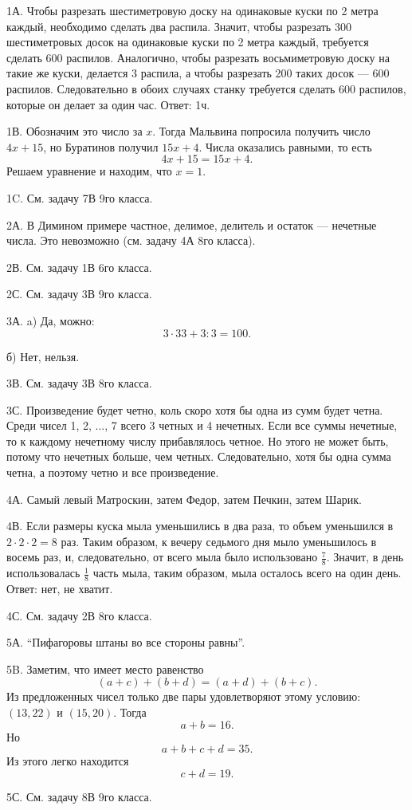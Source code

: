 \documentclass[12pt]{amsart}
\theoremstyle{definition}
\theoremstyle{remark}
\theoremstyle{plain}
\begin{document}
1А. Чтобы разрезать шестиметровую доску на одинаковые куски по 2 метра каждый, необходимо сделать два распила. Значит, чтобы разрезать 300 шестиметровых досок на одинаковые куски по 2 метра каждый, требуется сделать 600 распилов. Аналогично, чтобы разрезать восьмиметровую доску на такие же куски, делается 3 распила, а чтобы разрезать 200 таких досок --- 600 распилов. Следовательно в обоих случаях станку требуется сделать 600 распилов, которые он делает за один час. Ответ: 1ч.

1В. Обозначим это число за $x$. Тогда Мальвина попросила получить число $4x+15$, но Буратинов получил $15x+4$. Числа оказались равными, то есть
$$
4x+15=15x+4.
$$
Решаем уравнение и находим, что $x=1$.

1C. См. задачу 7В 9го класса.

2А. В Димином примере частное, делимое, делитель и остаток --- нечетные числа. Это невозможно (см. задачу 4А 8го класса).

2В. См. задачу 1В 6го класса.

2С. См. задачу 3В 9го класса.

3А. a) Да, можно:
$$
3\cdot 33+3:3=100.
$$

б) Нет, нельзя.

3В. См. задачу 3В 8го класса.

3С. Произведение будет четно, коль скоро хотя бы одна из сумм будет четна. Среди чисел 1, 2, ..., 7 всего 3 четных и 4 нечетных. Если все суммы нечетные, то к каждому нечетному числу прибавлялось четное. Но этого не может быть, потому что нечетных больше, чем четных. Следовательно, хотя бы одна сумма четна, а поэтому четно и все произведение.

4А. Самый левый Матроскин, затем Федор, затем Печкин, затем Шарик.

4В. Если размеры куска мыла уменьшились в два раза, то объем уменьшился в $2\cdot2\cdot2=8$ раз. Таким образом, к вечеру седьмого дня мыло уменьшилось в восемь раз, и, следовательно, от всего мыла было использовано $\frac{7}{8}$. Значит, в день использовалась $\frac{1}{8}$ часть мыла, таким образом, мыла осталось всего на один день. Ответ: нет, не хватит.

4С. См. задачу 2В 8го класса.

5А. "`Пифагоровы штаны во все стороны равны"'.

5B. Заметим, что имеет место равенство
$$
(a+c)+(b+d)=(a+d)+(b+c).
$$
Из предложенных чисел только две пары удовлетворяют этому условию: $(13,22)$ и $(15,20)$. Тогда
$$
a+b=16.
$$
Но
$$
a+b+c+d=35.
$$
Из этого легко находится
$$
c+d=19.
$$

5С. См. задачу 8В 9го класса.
\end{document}
